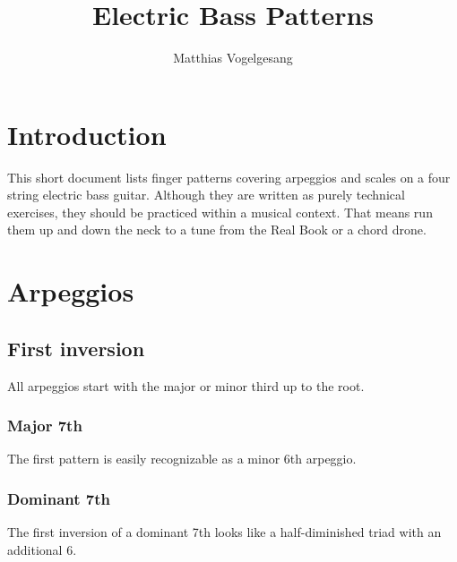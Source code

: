\documentclass[a4paper, parskip=half]{scrartcl}
\title{\vspace{-3em}Electric Bass Patterns}
\author{Matthias Vogelgesang}
\date{}
\newcommand{\addfingering}[2][10]{%
  \def\data{#2}
  \def\nfrets{#1}
  \pgfmathsetmacro\nfretsm{1+\nfrets}
  \foreach \x in {1, ..., \nfrets}
    \draw[fret] (\x, 0) -- (\x, 1.95);

  \foreach \y in {0, 0.65, 1.3, 1.95}
    \draw[string] (0, \y) -- (\nfretsm, \y);

  \foreach \x / \y / \z [count=\ni]  in \data{%
    \pgfmathsetmacro\yr{0.65*\y}
    \node[fretted] (fretted-\ni) at (\x, \yr) {\z};
  }
}
\begin{document}
\maketitle

\section{Introduction}

This short document lists finger patterns covering arpeggios and scales on a
four string electric bass guitar. Although they are written as purely technical
exercises, they should be practiced within a musical context. That means run
them up and down the neck to a tune from the Real Book or a chord drone.

\section{Arpeggios}

\subsection{First inversion}

All arpeggios start with the major or minor third up to the root.


\subsubsection*{Major 7th}

The first pattern is easily recognizable as a minor 6th arpeggio.
\vspace{1em}

\hspace{1em}


\subsubsection*{Dominant 7th}

The first inversion of a dominant 7th looks like a half-diminished triad with an
additional 6.

\vspace{1em}
\end{document}
